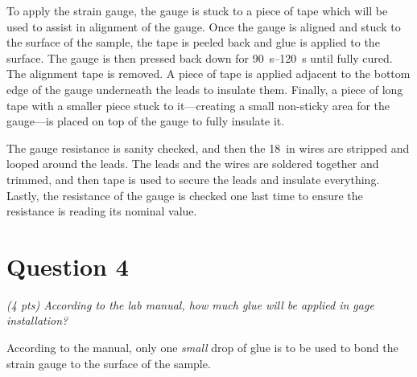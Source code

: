 \documentclass[12 pt]{article}
\begin{document}
To apply the strain gauge, the gauge is stuck to a piece of tape which will be used to assist in alignment of the gauge. Once the gauge is aligned and stuck to the surface of the sample, the tape is peeled back and glue is applied to the surface. The gauge is then pressed back down for \qtyrange{90}{120}{\second} until fully cured. The alignment tape is removed. A piece of tape is applied adjacent to the bottom edge of the gauge underneath the leads to insulate them. Finally, a piece of long tape with a smaller piece stuck to it---creating a small non-sticky area for the gauge---is placed on top of the gauge to fully insulate it.

The gauge resistance is sanity checked, and then the \qty{18}{in} wires are stripped and looped around the leads. The leads and the wires are soldered together and trimmed, and then tape is used to secure the leads and insulate everything. Lastly, the resistance of the gauge is checked one last time to ensure the resistance is reading its nominal value.

\section*{Question 4} \label{question_4}
\textit{(4 pts) According to the lab manual, how much glue will be applied in gage installation?}

According to the manual, only one \textit{small} drop of glue is to be used to bond the strain gauge to the surface of the sample.
\end{document}
